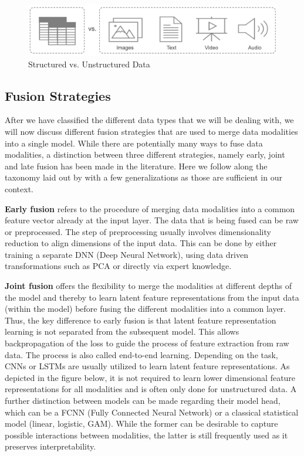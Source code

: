 \documentclass[
]{krantz}
\begin{document}
\begin{figure}

{\centering \includegraphics[width=1\linewidth]{figures/03-02-struc+unstruc-data/Struct_vs_Unstruct_Data} 

}

\caption{Structured vs. Unstructured Data}\label{fig:struc-vs-unstrc}
\end{figure}

\hypertarget{fusion-strategies}{%
\subsection{Fusion Strategies}\label{fusion-strategies}}

After we have classified the different data types that we will be dealing with, we will now discuss different fusion strategies that are used to merge data modalities into a single model. While there are potentially many ways to fuse data modalities, a distinction between three different strategies, namely early, joint and late fusion has been made in the literature. Here we follow along the taxonomy laid out by \citet{HuangFusion2020} with a few generalizations as those are sufficient in our context.

\textbf{Early fusion} refers to the procedure of merging data modalities into a common feature vector already at the input layer. The data that is being fused can be raw or preprocessed. The step of preprocessing usually involves dimensionality reduction to align dimensions of the input data. This can be done by either training a separate DNN (Deep Neural Network), using data driven transformations such as PCA or directly via expert knowledge.

\textbf{Joint fusion} offers the flexibility to merge the modalities at different depths of the model and thereby to learn latent feature representations from the input data (within the model) before fusing the different modalities into a common layer. Thus, the key difference to early fusion is that latent feature representation learning is not separated from the subsequent model. This allows backpropagation of the loss to guide the process of feature extraction from raw data. The process is also called end-to-end learning. Depending on the task, CNNs or LSTMs are usually utilized to learn latent feature representations. As depicted in the figure below, it is not required to learn lower dimensional feature representations for all modalities and is often only done for unstructured data. A further distinction between models can be made regarding their model head, which can be a FCNN (Fully Connected Neural Network) or a classical statistical model (linear, logistic, GAM). While the former can be desirable to capture possible interactions between modalities, the latter is still frequently used as it preserves interpretability.
\end{document}
